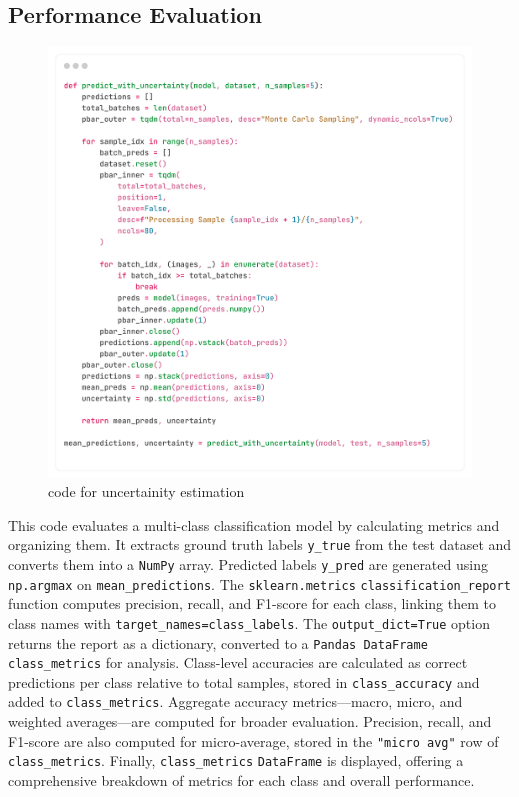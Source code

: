 \documentclass[12pt,onecolumn]{report}
\begin{document}
\subsection{Performance Evaluation}
\begin{figure}[H]
    \centering
    \includegraphics[width=0.8\columnwidth]{figures/imp_uncertainity_estimation.png}  %
    \caption{code for uncertainity estimation} %
    \label{fig:imp_uncertainity_estimation} %
\end{figure}
This code evaluates a multi-class classification model by calculating metrics and organizing them. It extracts ground truth labels \texttt{y\_true} from the test dataset and converts them into a \texttt{NumPy} array. Predicted labels \texttt{y\_pred} are generated using \texttt{np.argmax} on \texttt{mean\_predictions}. The \texttt{sklearn.metrics} \texttt{classification\_report} function computes precision, recall, and F1-score for each class, linking them to class names with \texttt{target\_names=\newline class\_labels}. The \texttt{output\_dict=True} option returns the report as a dictionary, converted to a \texttt{Pandas DataFrame} \texttt{class\_metrics} for analysis. Class-level accuracies are calculated as correct predictions per class relative to total samples, stored in \texttt{class\_accuracy} and added to \texttt{class\_metrics}. Aggregate accuracy metrics—macro, micro, and weighted averages—are computed for broader evaluation. Precision, recall, and F1-score are also computed for micro-average, stored in the \texttt{"micro avg"} row of \texttt{class\_metrics}. Finally, \texttt{class\_metri\newline cs} \texttt{DataFrame} is displayed, offering a comprehensive breakdown of metrics for each class and overall performance.
\end{document}
